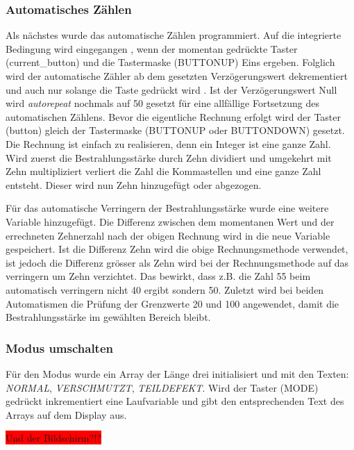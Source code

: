 \subsubsection{Automatisches Zählen} 
Als nächstes wurde das automatische Zählen programmiert. Auf die integrierte Bedingung wird eingegangen , wenn der momentan gedrückte Taster (current\_button) und die Tastermaske (BUTTONUP) Eins ergeben. Folglich wird der automatische Zähler ab dem gesetzten Verzögerungswert dekrementiert und auch nur solange die Taste gedrückt wird . Ist der Verzögerungswert Null wird \textit{autorepeat} nochmals auf 50 gesetzt für eine allfällige Fortsetzung des automatischen Zählens. Bevor die eigentliche Rechnung erfolgt wird der Taster (button) gleich der Tastermaske (BUTTONUP oder BUTTONDOWN) gesetzt. Die Rechnung ist einfach zu realisieren, denn ein Integer ist eine ganze Zahl. Wird zuerst die Bestrahlungsstärke durch Zehn dividiert und umgekehrt mit Zehn multipliziert verliert die Zahl die Kommastellen und eine ganze Zahl entsteht. Dieser wird nun Zehn hinzugefügt oder abgezogen.

Für das automatische Verringern der Bestrahlungsstärke wurde eine weitere Variable hinzugefügt. Die Differenz zwischen dem momentanen Wert und der errechneten Zehnerzahl nach der obigen Rechnung wird in die neue Variable gespeichert. Ist die Differenz Zehn wird die obige Rechnungsmethode verwendet, ist jedoch die Differenz grösser als Zehn wird bei der Rechnungsmethode auf das verringern um Zehn verzichtet. Das bewirkt, dass z.B. die Zahl 55 beim automatisch verringern nicht 40 ergibt sondern 50. Zuletzt wird bei beiden Automatismen die Prüfung der Grenzwerte 20 und 100 angewendet, damit die Bestrahlungsstärke im gewählten Bereich bleibt.

\subsubsection{Modus umschalten} 
Für den Modus wurde ein Array der Länge drei initialisiert und mit den Texten: \textit{NORMAL}, \textit{VERSCHMUTZT}, \textit{TEILDEFEKT}. Wird der Taster (MODE) gedrückt inkrementiert eine Laufvariable und gibt den entsprechenden Text des Arrays auf dem Display aus.

\colorbox{red}{Und der Bildschirm?!?}
